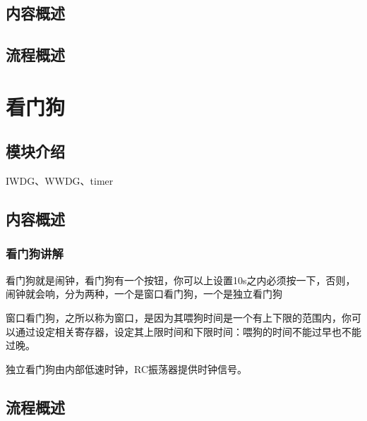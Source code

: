 \documentclass[UTF8]{ctexart}
\begin{document}
\subsection{内容概述}
\subsection{流程概述}

\section{看门狗}

\subsection{模块介绍}
IWDG、WWDG、timer
\subsection{内容概述}
\subsubsection{看门狗讲解}
看门狗就是闹钟，看门狗有一个按钮，你可以上设置10s之内必须按一下，否则，闹钟就会响，分为两种，一个是窗口看门狗，一个是独立看门狗

窗口看门狗，之所以称为窗口，是因为其喂狗时间是一个有上下限的范围内，你可以通过设定相关寄存器，设定其上限时间和下限时间：喂狗的时间不能过早也不能过晚。

独立看门狗由内部低速时钟，RC振荡器提供时钟信号。

\subsection{流程概述}
\end{document}
